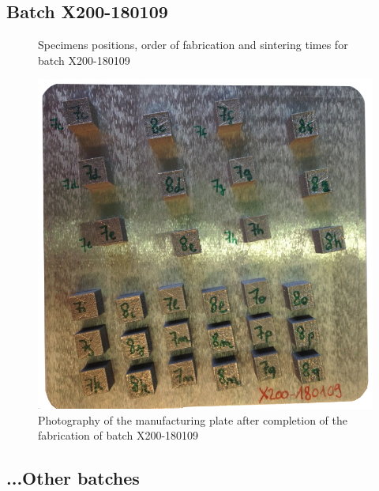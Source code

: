 \subsection{Batch X200-180109}

\begin{figure}[ht]
\centering
\noindent{}
\decoRule
\caption[Specimens positions, order of fabrication and sintering times for batch X200-180109]{Specimens positions, order of fabrication and sintering times for batch X200-180109}
\label{fig:171024-cad}
\end{figure}

\begin{figure}[ht]
\centering
\includegraphics[scale=0.45]{Images/180109-real}
\decoRule
\caption[Photography of the manufacturing plate after completion of the fabrication of batch X200-180109]{Photography of the manufacturing plate after completion of the fabrication of batch X200-180109}
\label{fig:180109-real}
\end{figure}

\subsection{...Other batches}